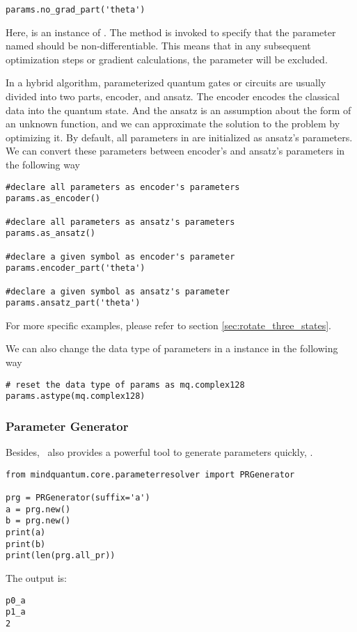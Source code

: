 \begin{lstlisting}
params.no_grad_part('theta')
\end{lstlisting}

Here,  is an instance of \ParameterResolver. The  method is invoked to specify that the parameter named  should be non-differentiable. This means that in any subsequent optimization steps or gradient calculations, the  parameter will be excluded.

In a hybrid algorithm, parameterized quantum gates or circuits are usually divided into two parts, encoder, and ansatz. The encoder encodes the classical data into the quantum state. And the ansatz is an assumption about the form of an unknown function, and we can approximate the solution to the problem by optimizing it. By default, all parameters in \ParameterResolver are initialized as ansatz's parameters. We can convert these parameters between encoder's and ansatz's parameters in the following way

\begin{lstlisting}
#declare all parameters as encoder's parameters
params.as_encoder()

#declare all parameters as ansatz's parameters
params.as_ansatz()

#declare a given symbol as encoder's parameter
params.encoder_part('theta')

#declare a given symbol as ansatz's parameter
params.ansatz_part('theta')
\end{lstlisting}

For more specific examples, please refer to section \ref{sec:rotate_three_states}.

We can also change the data type of parameters in a \ParameterResolver instance in the following way
\begin{lstlisting}
# reset the data type of params as mq.complex128
params.astype(mq.complex128)
\end{lstlisting}

\subsubsection{Parameter Generator}

Besides, \MindQuantum\ also provides a powerful tool to generate parameters quickly, \PRGenerator.
\begin{lstlisting}
from mindquantum.core.parameterresolver import PRGenerator

prg = PRGenerator(suffix='a')
a = prg.new()
b = prg.new()
print(a)
print(b)
print(len(prg.all_pr))
\end{lstlisting}
The output is:
\begin{lstlisting}
p0_a
p1_a
2
\end{lstlisting}
